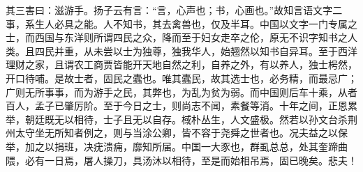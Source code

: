 \documentclass[letterpaper, 12pt]{article}
\begin{document}
\begin{multicols}{2}
其三害曰：滋游手。扬子云有言：“言，心声也；书，心画也。”故知言语文字二事，系生人必具之能。人不知书，其去禽兽也，仅及半耳。中国以文字一门专属之士，而西国与东洋则所谓四民之众，降而至于妇女走卒之伦，原无不识字知书之人类。且四民并重，从未尝以士为独尊，独我华人，始翘然以知书自异耳。至于西洋理财之家，且谓农工商贾皆能开天地自然之利，自养之外，有以养人，独士枵然，开口待哺。是故士者，固民之蠹也。唯其蠹民，故其选士也，必务精，而最忌广；广则无所事事，而为游手之民，其弊也，为乱为贫为弱。而中国则后车十乘，从者百人，孟子已肇厉阶。至于今日之士，则尚志不闻，素餐等消。十年之间，正恩累举，朝廷既无以相待，士子且无以自存。棫朴丛生，人文盛极。然若以孙文台杀荆州太守坐无所知者例之，则与当涂公卿，皆不容于尧舜之世者也。况夫益之以保举，加之以捐班，决疣溃痈，靡知所届。中国一大豕也，群虱总总，处其奎蹄曲隈，必有一日焉，屠人操刀，具汤沐以相待，至是而始相吊焉，固已晚矣。悲夫！
\end{multicols} 
\end{document}
